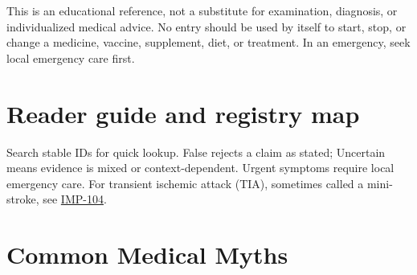 \documentclass[11pt,oneside]{book}
\begin{document}
This is an educational reference, not a substitute for examination, diagnosis, or individualized medical advice. No entry should be used by itself to start, stop, or change a medicine, vaccine, supplement, diet, or treatment. In an emergency, seek local emergency care first.
\chapter*{Reader guide and registry map}
Search stable IDs for quick lookup. False rejects a claim as stated; Uncertain means evidence is mixed or context-dependent. Urgent symptoms require local emergency care. For transient ischemic attack (TIA), sometimes called a mini-stroke, see \hyperlink{stroke-warning-signs}{IMP-104}.
\tableofcontents
\mainmatter
\chapter{Common Medical Myths}
\end{document}
